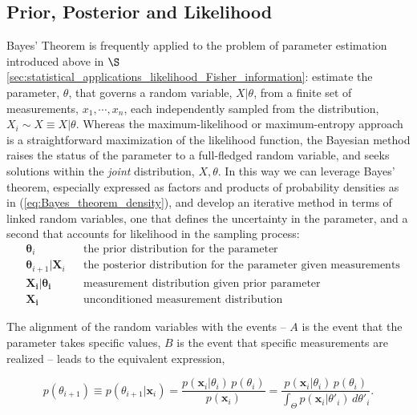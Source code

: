 \documentclass[12pt, twoside, draft]{article}
\begin{document}
\subsection{Prior, Posterior and Likelihood}\label{sec:prior_posterior_likelihood}
Bayes' Theorem is frequently applied to the problem of parameter estimation introduced above in $\S$\ref{sec:statistical_applications_likelihood_Fisher_information}: estimate the parameter, $\theta$, that governs a random variable, $X | \theta$, from a finite set of measurements, $x_1, \cdots, x_n$, each independently sampled from the distribution, $X_i \sim X \equiv X | \theta$.  Whereas the maximum-likelihood or maximum-entropy approach is a straightforward maximization of the likelihood function, the Bayesian method raises the status of the parameter to a full-fledged random variable, and seeks solutions within the \textit{joint} distribution, $X, \theta$.  In this way we can leverage Bayes' theorem, especially expressed as factors and products of probability densities as in (\ref{eq:Bayes_theorem_density}), and develop an iterative method in terms of linked random variables, one that defines the uncertainty in the parameter, and a second that accounts for likelihood in the sampling process:
\begin{align}
& \mathbf{\boldsymbol{\theta}}_i &&  \text{the prior distribution for the parameter} \\
& \mathbf{\boldsymbol{\theta}}_{i+1} | \mathbf{X}_i && \text{the posterior distribution for the parameter given measurements} \\
& \mathbf{\mathbf{X}_i | \boldsymbol{\theta_i}} && \text{measurement distribution given prior parameter} \\
& \mathbf{\mathbf{X}_i} && \text{unconditioned measurement distribution}
\end{align}

The alignment of the random variables with the events -- $A$ is the event that the parameter takes specific values, $B$ is the event that specific measurements are realized -- leads to the equivalent expression,

\begin{equation}\label{eq:Bayes_theorem_iterative}
p(\theta_{i+1}) \equiv p(\theta_{i+1} | \mathbf{x}_i) = \frac{p(\mathbf{x}_i | \theta_i) \,p(\theta_i)}{p(\mathbf{x}_i)} =  \frac{p(\mathbf{x}_i | \theta_i) \,p(\theta_i)}{\int_\Theta p(\mathbf{x}_i | \theta'_i) \, d\theta'_i}.
\end{equation}
\end{document}
